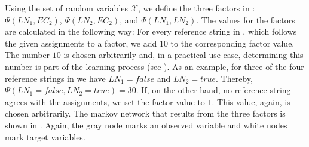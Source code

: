 Using the set of \glspl{random variable} $\mathcal{X}$, we define the three factors in : $\Psi(LN_1,EC_2)$, $\Psi(LN_2,EC_2)$, and $\Psi(LN_1,LN_2)$.
The values for the factors are calculated in the following way:
For every reference string in , which follows the given \glspl{assignment} to a \gls{factor}, we add $10$ to the corresponding factor value.
The number $10$ is chosen arbitrarily and, in a practical use case, determining this number is part of the learning process (see ).
As an example, for three of the four reference strings in  we have $LN_1=\mathit{false}$ and $LN_2=\mathit{true}$.
Thereby, $\Psi(LN_1=\mathit{false},LN_2=\mathit{true})=30$.
If, on the other hand, no reference string agrees with the \glspl{assignment}, we set the factor value to $1$.
This value, again, is chosen arbitrarily.
The \gls{markov network} that results from the three \glspl{factor} is shown in .
Again, the gray \gls{node} marks an \gls{observed variable} and white \glspl{node} mark \glspl{target variable}.

